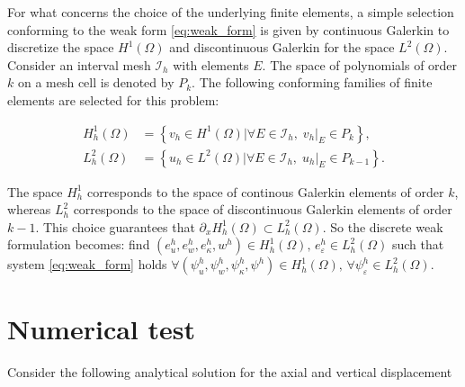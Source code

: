 \documentclass{ifacconf}
\begin{document}
For what concerns the choice of the underlying finite elements, a simple selection conforming to the weak form \eqref{eq:weak_form} is given by continuous Galerkin to discretize the space $H^1(\Omega)$ and discontinuous Galerkin for the space $L^2(\Omega)$. Consider an interval mesh $\mathcal{I}_h$ with elements $E$. The space of polynomials of order $k$ on a mesh cell is denoted by $P_k$. The following conforming families of finite elements are selected for this problem:

\begin{equation}
	\begin{aligned}
		H^1_h(\Omega) &= \left\{v_h \in H^1(\Omega)\vert \forall E \in \mathcal{I}_h, \; v_h\vert_E \in P_k \right\}, \\
		L^2_h(\Omega) &= \left\{u_h \in L^2(\Omega)\vert \forall E \in \mathcal{I}_h, \; u_h\vert_E \in P_{k-1} \right\}.
	\end{aligned}
\end{equation}

The space $H^1_h$ corresponds to the space of continous Galerkin elements of order $k$, whereas $L^2_h$ corresponds to the space of discontinuous Galerkin elements of order $k-1$. This choice guarantees that $\partial_x H^1_h(\Omega) \subset L^2_h(\Omega)$. So the discrete weak formulation becomes: find $(e_u^h, e_w^h, e_\kappa^h, w^h) \in H^1_h(\Omega), \, e_\varepsilon^h \in L_h^2(\Omega)$
such that system \eqref{eq:weak_form} holds $\forall (\psi_u^h, \psi_w^h, \psi_\kappa^h, \psi^h) \in H^1_h(\Omega), \, \forall \psi_\varepsilon^h \in L^2_h(\Omega)$.

\section{Numerical test}\label{sec:num_test}

Consider the following analytical solution for the axial and vertical displacement
\end{document}
